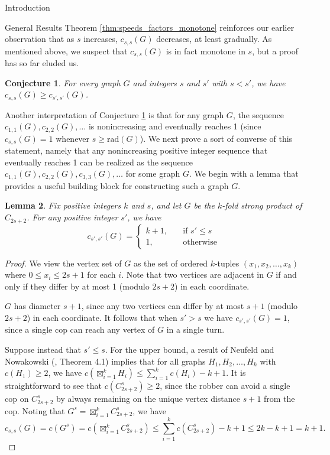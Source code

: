 \documentclass[12pt]{amsart}
\newtheorem{lemma}{Lemma}[section]
\newtheorem{conjecture}[lemma]{Conjecture}
\theoremstyle{definition}
\newcommand{\speeds}{c_{s,s}}
\newcommand{\speed}[1]{c_{#1,#1}}
\begin{document}
\begin{section}{Introduction}
\begin{section}{General Results}
Theorem \ref{thm:speeds_factors_monotone} reinforces our earlier observation that as $s$ increases, $\speeds(G)$ decreases, at least gradually.  As mentioned above, we suspect that $\speeds(G)$ is in fact monotone in $s$, but a proof has so far eluded us.

\begin{conjecture}\label{conj:monotone}
For every graph $G$ and integers $s$ and $s'$ with $s < s'$, we have $\speed{s}(G) \ge \speed{s'}(G)$.
\end{conjecture}

Another interpretation of Conjecture \ref{conj:monotone} is that for any graph $G$, the sequence $\speed{1}(G), \speed{2}(G), \dots$ is nonincreasing and eventually reaches 1 (since $\speeds(G) = 1$ whenever $s \ge \textrm{rad}(G)$).  We next prove a sort of converse of this statement, namely that any nonincreasing positive integer sequence that eventually reaches 1 can be realized as the sequence $\speed{1}(G), \speed{2}(G), \speed{3}(G), \dots$ for some graph $G$.  We begin with a lemma that provides a useful building block for constructing such a graph $G$.

\begin{lemma} \label{lem:speed_s_graph_building}
Fix positive integers $k$ and $s$, and let $G$ be the $k$-fold strong product of $C_{2s+2}$.  For any positive integer $s'$, we have
$$\speed{s'}(G) = \left\{\begin{array}{ll}k+1, \quad &\text{if } s' \le s\\1, &\text{otherwise}\end{array}\right .$$
\end{lemma}
\begin{proof}
We view the vertex set of $G$ as the set of ordered $k$-tuples $(x_1, x_2, \dots, x_k)$ where $0 \le x_i \le 2s+1$ for each $i$.  Note that two vertices are adjacent in $G$ if and only if they differ by at most 1 (modulo $2s+2$) in each coordinate.

$G$ has diameter $s+1$, since any two vertices can differ by at most $s+1$ (modulo $2s+2$) in each coordinate.  It follows that when $s' > s$ we have $\speed{s'}(G) = 1$, since a single cop can reach any vertex of $G$ in a single turn. 

Suppose instead that $s' \le s$.  For the upper bound, a result of Neufeld and Nowakowski (\cite{NN98}, Theorem 4.1) implies that for all graphs $H_1, H_2, \dots, H_k$ with $c(H_1) \ge 2$, we have $c(\boxtimes_{i=1}^k H_i) \le \sum_{i=1}^k c(H_i) -k+1$.  It is straightforward to see that $c(C_{2s+2}^s) \ge 2$, since the robber can avoid a single cop on $C_{2s+2}^s$ by always remaining on the unique vertex distance $s+1$ from the cop.  Noting that $G^s = \boxtimes_{i=1}^k C_{2s+2}^s$, we have
$$\speed{s}(G) = c(G^s) = c\left (\boxtimes_{i=1}^k C_{2s+2}^s\right) \le \sum_{i=1}^k c(C_{2s+2}^s) - k + 1 \le 2k-k+1 = k+1.$$


\end{proof}
\end{section}
\end{section}
\end{document}
